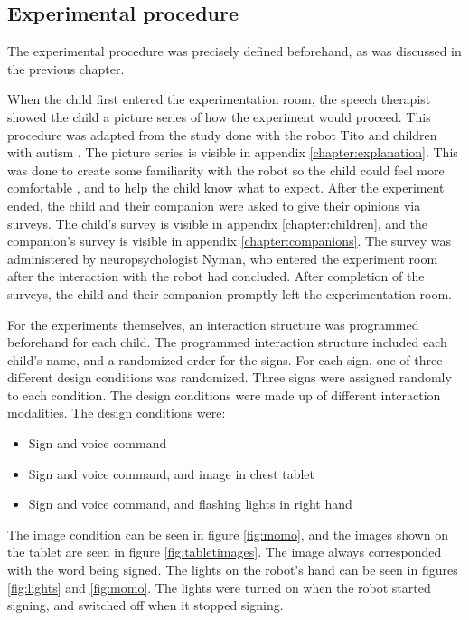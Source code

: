\subsection{Experimental procedure}

The experimental procedure was precisely defined beforehand, as was discussed in the previous chapter.

When the child first entered the experimentation room, the speech therapist showed the child a picture series of how the experiment would proceed. This procedure was adapted from the study done with the robot Tito and children with autism \cite{duquette2008exploring}. The picture series is visible in appendix \ref{chapter:explanation}. This was done to create some familiarity with the robot so the child could feel more comfortable \cite{duquette2008exploring}, and to help the child know what to expect. After the experiment ended, the child and their companion were asked to give their opinions via surveys. The child's survey is visible in appendix \ref{chapter:children}, and the companion's survey is visible in appendix \ref{chapter:companions}. The survey was administered by neuropsychologist Nyman, who entered the experiment room after the interaction with the robot had concluded. After completion of the surveys, the child and their companion promptly left the experimentation room.

For the experiments themselves, an interaction structure was programmed beforehand for each child. The programmed interaction structure included each child's name, and a randomized order for the signs. For each sign, one of three different design conditions was randomized. Three signs were assigned randomly to each condition. The design conditions were made up of different interaction modalities. The design conditions were:

\begin{itemize}
  \item Sign and voice command
  \item Sign and voice command, and image in chest tablet
  \item Sign and voice command, and flashing lights in right hand
\end{itemize}

The image condition can be seen in figure \ref{fig:momo}, and the images shown on the tablet are seen in figure \ref{fig:tabletimages}. The image always corresponded with the word being signed. The lights on the robot's hand can be seen in figures \ref{fig:lights} and \ref{fig:momo}. The lights were turned on when the robot started signing, and switched off when it stopped signing.

